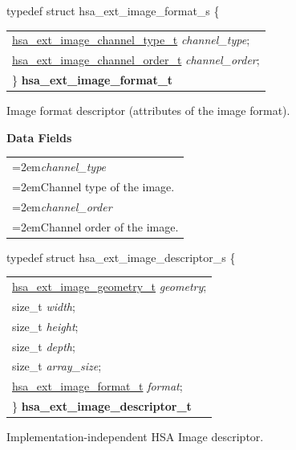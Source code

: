 \documentclass[final]{book}
\newcommand{\reffld}[1]{\textit{#1}}
\begin{document}
\noindent\begin{tcolorbox}[breakable,nobeforeafter,arc=0mm,colframe=white,colback=lightgray,left=0mm]
typedef struct  hsa_ext_image_format_s \{
\vspace{-3.5mm}\begin{longtable}{@{}p{\textwidth}}
\hspace{1.7em}\hyperlink{group__images_1gaa143aa6feeaf24103b886c571ace568f}{hsa_ext_image_channel_type_t} \reffld{channel_type};\\
\hspace{1.7em}\hyperlink{group__images_1gabaced4fb1f3b9fdaa978e143af5ff055}{hsa_ext_image_channel_order_t} \reffld{channel_order};\\
\}  \hypertarget{group__images_1gaeaafb5fb8c9a7d88973e05f0b11c239d}{\textbf{hsa_ext_image_format_t}}
\end{longtable}

\end{tcolorbox}
Image format descriptor (attributes of the image format).

\noindent\textbf{Data Fields}\\[-6mm]
\begin{longtable}{@{}>{\hangindent=2em}p{\textwidth}}
\reffld{channel_type}\\\hspace{2em}Channel type of the image.\\[2mm]
\reffld{channel_order}\\\hspace{2em}Channel order of the image.
\end{longtable}



\noindent\begin{tcolorbox}[breakable,nobeforeafter,arc=0mm,colframe=white,colback=lightgray,left=0mm]
typedef struct  hsa_ext_image_descriptor_s \{
\vspace{-3.5mm}\begin{longtable}{@{}p{\textwidth}}
\hspace{1.7em}\hyperlink{group__images_1gac61587d98a80d1660378e3904a66fc9c}{hsa_ext_image_geometry_t} \reffld{geometry};\\
\hspace{1.7em}size_t \reffld{width};\\
\hspace{1.7em}size_t \reffld{height};\\
\hspace{1.7em}size_t \reffld{depth};\\
\hspace{1.7em}size_t \reffld{array_size};\\
\hspace{1.7em}\hyperlink{group__images_1gaeaafb5fb8c9a7d88973e05f0b11c239d}{hsa_ext_image_format_t} \reffld{format};\\
\}  \hypertarget{group__images_1gab0fe2967d35754650148d121fdef2032}{\textbf{hsa_ext_image_descriptor_t}}
\end{longtable}

\end{tcolorbox}
Implementation-independent HSA Image descriptor.
\end{document}
